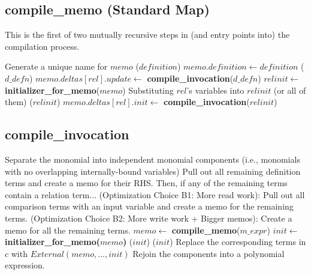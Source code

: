 \documentclass[11pt]{amsart}
\begin{document}
\subsection{compile\_memo (Standard Map)}

This is the first of two mutually recursive steps in (and entry points into) the compilation process.  

\begin{algorithmic}
\STATE Generate a unique name for $memo$
($definition$)
\STATE $memo.definition \gets definition$
  ($d\_defn$)
  \STATE $memo.deltas[rel].update \gets$ {\bf compile\_invocation}($d\_defn$)
\ENDFOR
{}
  \STATE $relinit \gets$ {\bf initializer\_for\_memo}($memo$)
  \STATE Substituting $rel$'s variables into $relinit$ (or all of them)
  ($relinit$)
  \STATE $memo.deltas[rel].init \gets$ {\bf compile\_invocation}($relinit$)
\ENDFOR
\end{algorithmic}




\subsection{compile\_invocation}
\begin{algorithmic}
\STATE Separate the monomial into independent monomial components (i.e., monomials with no overlapping internally-bound variables)
  \STATE Pull out all remaining definition terms and create a memo for their RHS.  Then, if any of the remaining terms contain a relation term...
  \STATE (Optimization Choice B1: More read work): Pull out all comparison terms with an input variable and create a memo for the remaining terms.
  \STATE (Optimization Choice B2: More write work + Bigger memos): Create a memo for all the remaining terms.
    \STATE $memo \gets$ {\bf compile\_memo}($m\_expr$)
    \STATE $init \gets$ {\bf initializer\_for\_memo($memo$)}
    ($init$)
    ($init$)
    \STATE Replace the corresponding terms in $c$ with $External(memo, \ldots, init)$
  \ENDFOR
\ENDFOR
\STATE Rejoin the components into a polynomial expression.
\end{algorithmic}
\end{document}
